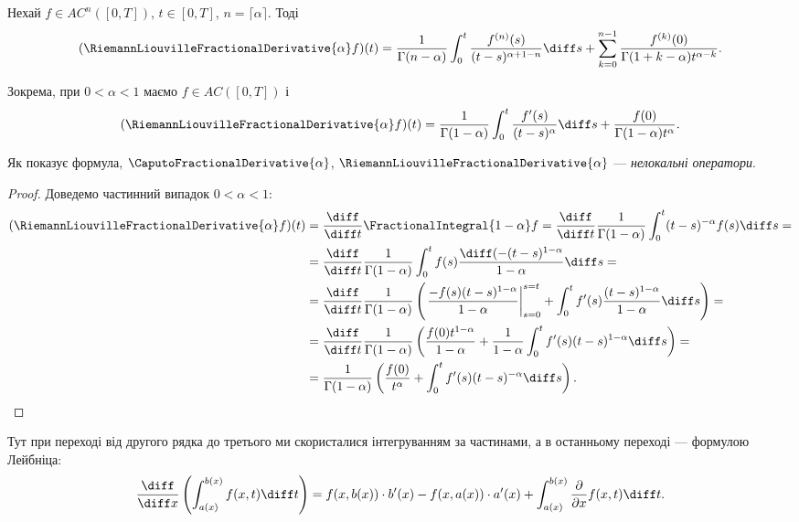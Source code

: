 \begin{theorem}
    Нехай $f \in AC^n([0, T])$, $t \in [0, T]$, $n = \lceil \alpha \rceil$. Тоді
    \begin{equation}
        (\RiemannLiouvilleFractionalDerivative{\alpha} f) (t) = \frac{1}{\Gamma(n - \alpha)} \int_0^t \frac{f^{(n)}(s)}{(t - s)^{\alpha + 1 - n}} \diff s + \sum_{k = 0}^{n - 1} \frac{f^{(k)}(0)}{\Gamma(1 + k - \alpha) t^{\alpha - k}}.
    \end{equation}
\end{theorem}
\begin{example}
    Зокрема, при $0 < \alpha < 1$ маємо $f \in AC([0, T])$ і
    \begin{equation}
        (\RiemannLiouvilleFractionalDerivative{\alpha} f) (t) = \frac{1}{\Gamma(1 - \alpha)} \int_0^t \frac{f'(s)}{(t - s)^\alpha} \diff s + \frac{f(0)}{\Gamma(1 - \alpha) t^\alpha}.
    \end{equation}
\end{example}
\begin{remark}
    Як показує формула, $\CaputoFractionalDerivative{\alpha}$, $\RiemannLiouvilleFractionalDerivative{\alpha}$ --- \textit{нелокальні оператори}.
\end{remark}
\begin{proof}
    Доведемо частинний випадок $0 < \alpha < 1$:
    \begin{equation}
        \begin{aligned}
            (\RiemannLiouvilleFractionalDerivative{\alpha} f)(t) &= \frac{\diff}{\diff t} \FractionalIntegral{1 - \alpha} f = \frac{\diff}{\diff t} \frac{1}{\Gamma(1 - \alpha)} \int_0^t (t - s)^{-\alpha} f(s) \diff s = \\
            &= \frac{\diff}{\diff t} \frac{1}{\Gamma(1 - \alpha)} \int_0^t f(s) \frac{\diff (-(t-s)^{1-\alpha}}{1 - \alpha} \diff s = \\
            &= \frac{\diff}{\diff t} \frac{1}{\Gamma(1 - \alpha)} \left( \left. \frac{-f(s)(t-s)^{1-\alpha}}{1 - \alpha} \right|_{s = 0}^{s = t} + \int_0^t f'(s) \frac{(t - s)^{1- \alpha}}{1 - \alpha} \diff s \right) = \\
            &= \frac{\diff}{\diff t} \frac{1}{\Gamma(1 - \alpha)} \left( \frac{f(0) t^{1-\alpha}}{1 - \alpha} + \frac{1}{1 - \alpha} \int_0^t f'(s) (t - s)^{1 - \alpha} \diff s \right) = \\
            &= \frac{1}{\Gamma(1 - \alpha)} \left( \frac{f(0)}{t^\alpha} + \int_0^t f'(s) (t - s)^{- \alpha} \diff s \right).
        \end{aligned}
    \end{equation}
\end{proof}
\begin{remark}
    Тут при переході від другого рядка до третього ми скористалися інтегруванням за частинами, а в останньому переході --- формулою Лейбніца:
    \begin{equation}
        \frac{\diff}{\diff x} \left(\int_{a(x)}^{b(x)} f(x,t) \diff t \right) = f(x, b(x)) \cdot b'(x) - f(x, a(x)) \cdot a'(x) + \int_{a(x)}^{b(x)} \frac{\partial}{\partial x} f(x,t) \diff t.    
    \end{equation}
\end{remark}

